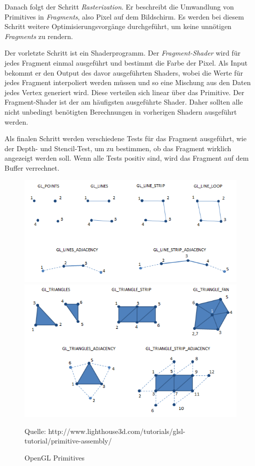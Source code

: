Danach folgt der Schritt \textit{Rasterization}. Er beschreibt die Umwandlung von Primitives in \textit{Fragments}, also Pixel auf dem Bildschirm. Es werden bei diesem Schritt weitere Optimisierungsvorgänge durchgeführt, um keine unnötigen \textit{Fragments} zu rendern.

Der vorletzte Schritt ist ein Shaderprogramm. Der \textit{Fragment-Shader} wird für jedes Fragment einmal ausgeführt und bestimmt die Farbe der Pixel. Als Input bekommt er den Output des davor ausgeführten Shaders, wobei die Werte für jedes Fragment interpoliert werden müssen und so eine Mischung aus den Daten jedes Vertex generiert wird. 
Diese verteilen sich linear über das Primitive. Der Fragment-Shader ist der am häufigsten ausgeführte Shader. Daher sollten alle nicht unbedingt benötigten Berechnungen in vorherigen Shadern ausgeführt werden.

Als finalen Schritt werden verschiedene Tests für das Fragment ausgeführt, wie der Depth- und Stencil-Test,
 um zu bestimmen, ob das Fragment wirklich angezeigt werden soll. Wenn alle Tests positiv sind, wird das Fragment 
auf dem Buffer verrechnet.
\begin{figure}
	\centering
	\includegraphics[scale=0.7]{02theorie/openglPrimitives.png}
	\includegraphics[scale=0.7]{02theorie/openglPrimitives2.png}
	
	
	Quelle: http://www.lighthouse3d.com/tutorials/glsl-tutorial/primitive-assembly/
	\caption{OpenGL Primitives}\label{OpenGLPrimitives}
\end{figure}


